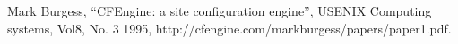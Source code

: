 Mark Burgess, ``CFEngine: a site configuration engine'',
USENIX Computing systems, Vol8, No. 3 1995,
http://cfengine.com/markburgess/papers/paper1.pdf.
